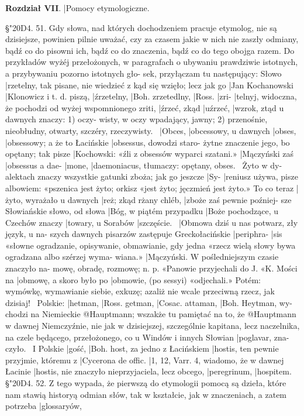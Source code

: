 
\textbf{Rozdział VII}.
|{Pomocy etymologiczne}. %

§\char"20D4. 51.
Gdy słowa, nad których dochodzeniem pracuje etymolog,
nie są dzisiejsze, powinien pilnie uważać, czy za czasem
jakie w nich nie zaszły odmiany, bądź co do pisowni ich,
bądź co do znaczenia, bądź co do tego obojga razem. Do
przykładów wyżéj przełożonych, w paragrafach o ubywaniu
prawdziwie istotnych, a przybywaniu pozorno istotnych gło-
sek, przyłączam tu następujący: Słowo |{rzetelny}, tak pisane,
nie wiedzieć z kąd się wzięło; lecz jak go |{Jan Kochanowski}
|{Klonowicz} i t. d. piszą, |{źrzetelny}, |{Boh}. zrzetedlny, |{Ross}. |{zri-}
|{telnyj}, widoczna, że pochodzi od wyżej wspomnionego zriti,
|{źrzeć}, zkąd |{uźrzeć}, |{wzrok}, ztąd u dawnych znaczy: 1) oczy-
wisty, w oczy wpadający, jawny; 2) przenośnie, nieobłudny,
otwarty, szczéry, rzeczywisty. \textemdash\ |{Obces}, |{obcessowy}, u dawnych
|{obses}, |{obsessowy}; a że to Łacińskie |{obsessus}, dowodzi staro-
żytne znaczenie jego, bo opętany; tak pisze |{Kochowski:} «źli
z obsessów wyparci szatani.» |{Mączyński} zaś |{obsessus a dae-}
|{mone}, |{daemoniacus}, tłumaczy: opętany, obses. \textemdash\ Żyto w dy-
alektach znaczy wszystkie gatunki zboża; jak go jeszcze |{Sy-}
|{reniusz} używa, pisze albowiem: «pszenica jest żyto; orkisz
«jest żyto; jęczmień jest żyto.» To co teraz |{żyto}, wyrażało
u dawnych |{reż}; zkąd rżany chléb, |{zboże} zaś pewnie poźniej-
sze Słowiańskie słowo, od słowa |{Bóg}, w piątém przypadku
|{Boże} pochodzące, u Czechów znaczy |{towary}, u Sorabów
|{szczęście}. \textemdash\ |{Obmowa} dziś u nas potwarz, zły język, u na-
szych dawnych pisarzów zastępuje Greckołacińskie |{periphra-}
|{sis} «słowne ogradzanie, opisywanie, obmawianie, gdy jedna
«rzecz wielą słowy bywa ogradzana albo szérzej wyma-
wiana.» |{Mączyński}. W pośledniejszym czasie znaczyło na-
mowę, obradę, rozmowę; n. p. «Panowie przyjechali do J.
«K. Mości na |{obmowę}, a skoro było po |{obmowie}, (po sessyi)
«odjechali.» Potém: wymówkę, wymawianie siebie, exkuzę;
azaliż nie wcale przeciwną rzecz, jak dzisiaj! \textemdash\ Polskie:
|{hetman}, |{Ross}. getman, |{Cosac}. attaman, |{Boh}. Heytman, wy-
chodzi na Niemieckie @{Hauptmann}; wszakże tu pamiętać na to,
że @{Hauptmann} w dawnej Niemczyźnie, nie jak w dzisiejszej,
szczególnie kapitana, lecz naczelnika, na czele będącego,
przełożonego, co u Windów i innych Słowian |{poglavar}, zna-
czyło. \textemdash\ I Polskie |{gość}, |{Boh}. host, za jedno z Łacińskiem
|{hostis}, ten pewnie przyjmie, któremu z |{Cycerona de offic}.
|{1, 12, Varr. 4}, wiadomo, że w dawnej Łacinie |{hostis}, nie
znaczyło nieprzyjaciela, lecz obcego, |{peregrinum}, |{hospitem}.
§\char"20D4. 52.
Z tego wypada, że pierwszą do etymologii pomocą są
dzieła, które nam stawią historyą odmian słów, tak w
kształcie, jak w znaczeniach, a zatem potrzeba |{glossaryów},


